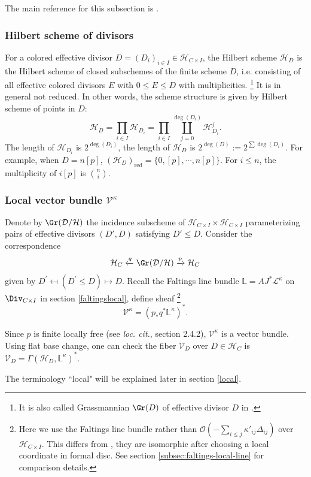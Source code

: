 \documentclass{amsart}
\numberwithin{equation}{section}
\numberwithin{figure}{section}
\theoremstyle{definition}
\theoremstyle{remark}
\renewcommand{\c}[1]{\mathcal{#1}}
\renewcommand{\b}[1]{\mathbb{#1}}
\begin{document}
The main reference for this subsection is \cite[section 2]{mirkovic2021loop}.

\subsubsection{Hilbert scheme of divisors}
\label{Hilbertdivisor}
For a colored effective divisor $D=(D_i)_{i\in I}\in \c H_{C\times I}$, the 
Hilbert scheme $\c H_D$  is the Hilbert scheme of closed subschemes of the finite scheme $D$, i.e. consisting of all 
effective colored divisors $E$ with $0\le E\le D$ with multiplicities.
\footnote{It is also called Grassmannian $\Gr(D)$ of effective divisor $D$ in \cite{mirkovic2021loop,mirkovic2023lattice,dong2026loop}.} It is in general not reduced.
In other words, the scheme structure is given by Hilbert scheme of points in $D$:
$$\c H_D=\prod_{i\in I} \c H_{D_i}=\prod_{i\in I} \coprod_{j=0}^{\deg(D_i)}\c H^j_{D_i}.$$ The length of 
$\c H_{D_i}$ is $2^{\deg(D_i)}$, the length of $\c H_D$ is $2^{\deg(D)}:=2^{\sum \deg(D_i)}$.
For example, when $D=n[p]$, $(\c H_D)_{\text{red}}=\{0,[p],\cdots,n[p]\}$. For $i\le n$, the multiplicity of $i[p]$ is $\binom{n}{i}$.  

\subsubsection{Local vector bundle $\c V^\kappa$}
\label{c V}
Denote by $\Gr(\c D/\c H)$ the incidence subscheme of $\c H_{C\times I}\times \c H_{C\times I}$ parameterizing pairs of effective divisors $(D',D)$ satisfying $D'\le D$.
Consider the correspondence $$\c{H}_C\xleftarrow{q} \Gr(\c D/\c H)\xrightarrow{p} \c{H}_C$$ given by $D^\prime\mapsfrom (D^\prime\le D)\mapsto D$. Recall the Faltings line bundle $\mathbb L=AJ^*\c L^\kappa$ on $\Div_{C\times I}$ in section \ref{faltingslocal}, define sheaf 
\footnote{Here we use the Faltings line bundle rather than $\c O(-\sum_{i\le j}\kappa'_{ij}\Delta_{ij})$ over $\c H_{C\times I}$. This differs from \cite{mirkovic2021loop}, they are isomorphic after choosing a local coordinate in formal disc. See section \ref{subsec:faltings-local-line} for comparison details.}
$$\c V^\kappa=(p_*q^*\b{L}^\kappa)^*.$$


Since $p$ is finite locally free (see \textit{loc. cit.}, section 2.4.2), $\c V^\kappa$ is a vector bundle. Using flat base change, one can check the fiber $\c{V}_D$ over $D\in\c{H}_C$ is $\c{V}_D=\Gamma(\c H_D,\b{L}^\kappa)^*$. 

The terminology ``local" will be explained later in section \ref{local}.
\end{document}

